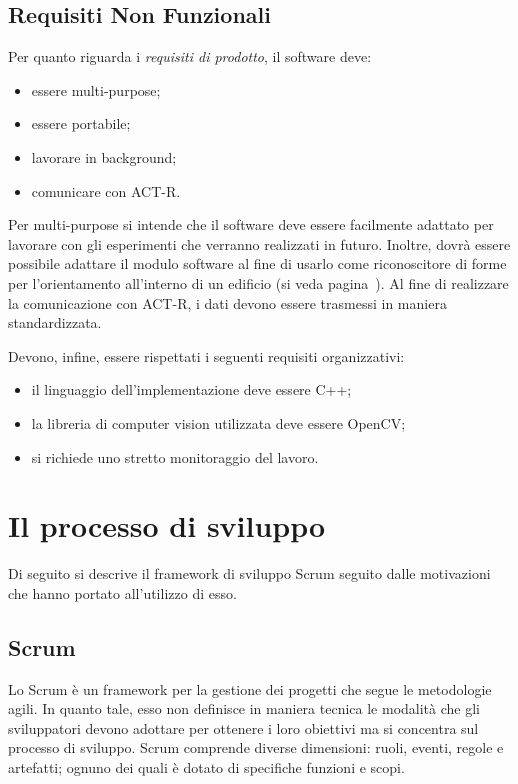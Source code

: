 		\subsection*{Requisiti Non Funzionali}
			Per quanto riguarda i \emph{requisiti di prodotto}, il software deve:
			\begin{itemize}
				\item essere multi-purpose;
				\item essere portabile;
			   \item lavorare in background;			
				\item comunicare con \mbox{ACT-R}.			
			\end{itemize}
			
		Per multi-purpose si intende che il software deve essere facilmente adattato per lavorare con gli esperimenti che verranno realizzati in futuro.
		Inoltre, dovrà essere possibile adattare il modulo software al fine di usarlo come riconoscitore di forme per l'orientamento all'interno di un edificio (si veda pagina~\pageref{obiettivi}).
		Al fine di realizzare la comunicazione con \mbox{ACT-R}, i dati devono essere trasmessi in maniera standardizzata.

		Devono, infine, essere rispettati i seguenti requisiti organizzativi:
		\begin{itemize}
				\item il linguaggio dell'implementazione deve essere C++;
				\item la libreria di computer vision utilizzata deve essere \mbox{OpenCV};
			   \item si richiede uno stretto monitoraggio del lavoro.					
			\end{itemize}	

	\section*{Il processo di sviluppo}
		Di seguito si descrive il framework di sviluppo Scrum seguito dalle motivazioni che hanno portato all'utilizzo di esso.
		
		\subsection*{Scrum}
			Lo Scrum è un framework per la gestione dei progetti che segue le metodologie agili.
			In quanto tale, esso non definisce in maniera tecnica le modalità che gli sviluppatori devono adottare per ottenere i loro obiettivi ma si concentra sul processo di sviluppo.
			Scrum comprende diverse dimensioni: ruoli, eventi, regole e artefatti; ognuno dei quali è dotato di specifiche funzioni e scopi.
			
